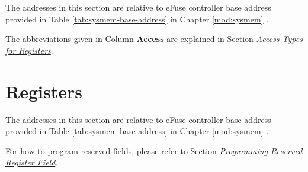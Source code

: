 \documentclass[main\_\_EN.tex]{subfiles}
\begin{document}
The addresses in this section are relative to eFuse controller base address provided in Table \ref{tab:sysmem-base-address} in Chapter \ref{mod:sysmem} \textit{}.

The abbreviations given in Column \textbf{Access} are explained in Section \hyperref[glossary-access-types]{\textit{Access Types for Registers}}.







\newpage
\section{Registers}

The addresses in this section are relative to eFuse controller base address provided in Table \ref{tab:sysmem-base-address} in Chapter \ref{mod:sysmem} \textit{}.

For how to program reserved fields, please refer to Section \hyperref[programming-reserved-field]{\textit{Programming Reserved Register Field}}.

\end{document}
